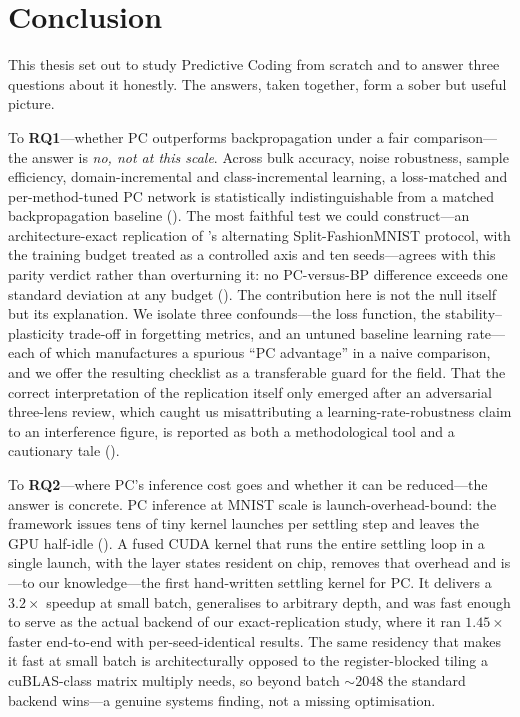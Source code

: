 \chapter{Conclusion}\label{ch:conclusion}

This thesis set out to study Predictive Coding from scratch and to answer three questions about
it honestly. The answers, taken together, form a sober but useful picture.

To \textbf{RQ1}---whether PC outperforms backpropagation under a fair comparison---the answer is
\emph{no, not at this scale}. Across bulk accuracy, noise robustness, sample efficiency,
domain-incremental and class-incremental learning, a loss-matched and per-method-tuned PC network
is statistically indistinguishable from a matched backpropagation baseline
(). The most faithful test we could construct---an architecture-exact
replication of \citet{song2024prospective}'s alternating Split-FashionMNIST protocol, with the
training budget treated as a controlled axis and ten seeds---agrees with this parity verdict
rather than overturning it: no PC-versus-BP difference exceeds one standard deviation at any
budget (). The contribution here is not the null itself but its explanation.
We isolate three confounds---the loss function, the stability--plasticity trade-off in forgetting
metrics, and an untuned baseline learning rate---each of which manufactures a spurious
``PC advantage'' in a naive comparison, and we offer the resulting checklist as a transferable
guard for the field. That the correct interpretation of the replication itself only emerged after
an adversarial three-lens review, which caught us misattributing a learning-rate-robustness claim
to an interference figure, is reported as both a methodological tool and a cautionary tale
().

To \textbf{RQ2}---where PC's inference cost goes and whether it can be reduced---the answer is
concrete. PC inference at MNIST scale is launch-overhead-bound: the framework issues tens of tiny
kernel launches per settling step and leaves the GPU half-idle (). A fused
CUDA kernel that runs the entire settling loop in a single launch, with the layer states resident
on chip, removes that overhead and is---to our knowledge---the first hand-written settling kernel
for PC. It delivers a $3.2\times$ speedup at small batch, generalises to arbitrary depth, and was
fast enough to serve as the actual backend of our exact-replication study, where it ran
$1.45\times$ faster end-to-end with per-seed-identical results. The same residency that makes it
fast at small batch is architecturally opposed to the register-blocked tiling a cuBLAS-class
matrix multiply needs, so beyond batch $\sim$$2048$ the standard backend wins---a genuine systems
finding, not a missing optimisation.

